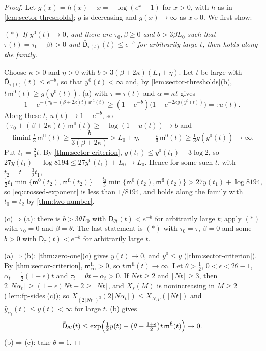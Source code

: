 \documentclass[11pt,a4paper]{amsart}
\theoremstyle{definition}
\theoremstyle{remark}
\numberwithin{equation}{section}
\newcommand{\TT}{\mathbb{T}}               %
\newcommand{\Zc}{\mathcal{Z}}              %
\newcommand{\XT}[2]{X_{#1}(#2)}            %
\newcommand{\cube}[1]{(2#1)^3}             %
\newcommand{\Mcirc}{\text{\upshape(M$^{\circ}$)}}   %
\newcommand{\tzero}{t_0}                   %
\begin{document}
\begin{proof}
Let $g(x)=h(x)-x=-\log(e^x-1)$ for $x>0$, with $h$ as in \cref{lem:sector-thresholds}; $g$ is decreasing and $g(x)\to\infty$ as $x\downarrow0$. We first show:

$(\ast)$ \emph{If $y^0(t)\to0$, and there are $\tau_0,\beta\ge0$ and $b>3\beta L_0$ such that $\tau(t)=\tau_0+\beta t>0$ and $\bar{\mathsf D}_{\tau(t)}(t)\le e^{-b}$ for arbitrarily large $t$, then \Mcirc{} holds along the family.}

Choose $\kappa>0$ and $\eta>0$ with $b>3(\beta+2\kappa)(L_0+\eta)$. Let $t$ be large with $\bar{\mathsf D}_{\tau(t)}(t)\le e^{-b}$, so that $y^0(t)<\infty$ and, by \cref{lem:sector-thresholds}(b), $t\,\mathsf m^0(t)\ge g(y^0(t))$. (a) with $\tau=\tau(t)$ and $\alpha=\kappa t$ gives
\[
1-e^{-(\tau_0+(\beta+2\kappa)t)\,\mathsf m^{\mathrm{fl}}(t)}\ge(1-e^{-b})\bigl(1-e^{-2\kappa g(y^0(t))}\bigr)=:u(t).
\]
Along these $t$, $u(t)\to1-e^{-b}$, so $(\tau_0+(\beta+2\kappa)t)\,\mathsf m^{\mathrm{fl}}(t)\ge-\log(1-u(t))\to b$ and
\[
\liminf\tfrac t3\,\mathsf m^{\mathrm{fl}}(t)\ge\frac b{3(\beta+2\kappa)}>L_0+\eta,\qquad \tfrac t3\,\mathsf m^0(t)\ge\tfrac13g(y^0(t))\to\infty .
\]
Put $t_1=\frac23t$. By \cref{thm:sector-criterion}, $y(t_1)\le y^0(t_1)+3\log2$, so $27y(t_1)+\log8194\le27y^0(t_1)+L_0\to L_0$. Hence for some such $t$, with $t_2=t=\frac32t_1$,
\[
\tfrac12t_1\min\bigl\{\mathsf m^0(t_2),\mathsf m^{\mathrm{fl}}(t_2)\bigr\}=\tfrac{t_2}3\min\bigl\{\mathsf m^0(t_2),\mathsf m^{\mathrm{fl}}(t_2)\bigr\}>27y(t_1)+\log8194,
\]
so \eqref{eq:crossed-exponent} is less than $1/8194$, and \Mcirc{} holds along the family with $\tzero=t_2$ by \cref{thm:two-number}.

(c)$\Rightarrow$(a): there is $b>3\theta L_0$ with $\bar{\mathsf D}_{\theta t}(t)<e^{-b}$ for arbitrarily large $t$; apply $(\ast)$ with $\tau_0=0$ and $\beta=\theta$. The last statement is $(\ast)$ with $\tau_0=\tau$, $\beta=0$ and some $b>0$ with $\bar{\mathsf D}_\tau(t)<e^{-b}$ for arbitrarily large $t$.

(a)$\Rightarrow$(b): \cref{thm:zero-one}(c) gives $y(t)\to0$, and $y^0\le y$ (\cref{thm:sector-criterion}). By \cref{thm:sector-criterion}, $\mathsf m^{\mathrm{fl}}_\infty>0$, so $t\,\mathsf m^{\mathrm{fl}}(t)\to\infty$. Let $\theta>\frac12$, $0<\epsilon<2\theta-1$, $\alpha_t=\frac12(1+\epsilon)t$ and $\tau_t=\theta t-\alpha_t>0$. If $N\epsilon t\ge2$ and $\lfloor Nt\rfloor\ge3$, then $2\lfloor N\alpha_t\rfloor\ge(1+\epsilon)Nt-2\ge\lfloor Nt\rfloor$, and $\XT{s}{M}$ is nonincreasing in $M\ge2$ (\cref{lem:fp-sides}(c)); so $\XT{\cube{\lfloor Nt\rfloor}}{2\lfloor N\alpha_t\rfloor}\le X_{N,p}(\lfloor Nt\rfloor)$ and $\hat y_{\alpha_t}(t)\le y(t)<\infty$ for large $t$. (b) gives
\[
\bar{\mathsf D}_{\theta t}(t)\le\exp\Bigl(\tfrac12y(t)-\bigl(\theta-\tfrac{1+\epsilon}2\bigr)t\,\mathsf m^{\mathrm{fl}}(t)\Bigr)\to0 .
\]
(b)$\Rightarrow$(c): take $\theta=1$.
\end{proof}
\end{document}
